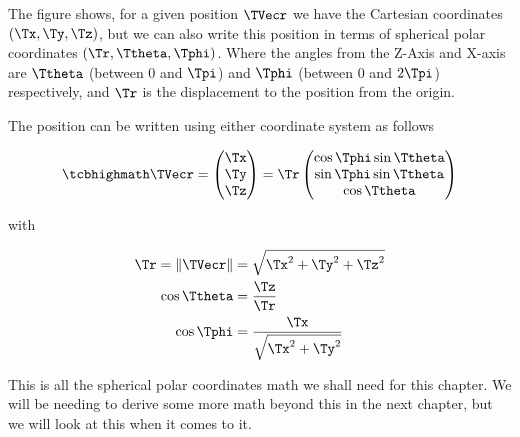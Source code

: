 The figure shows, for a given position $\TVecr $ we have the Cartesian coordinates $({\Tx },{\Ty },{\Tz })$, but we can also write this position in terms of spherical polar coordinates $(\Tr ,\Ttheta ,\Tphi )$.
Where the angles from the Z-Axis and X-axis are $\Ttheta $ (between 0 and $\Tpi $) and $\Tphi $ (between 0 and $2\Tpi $) respectively, and ${\Tr }$ is the displacement to the position from the origin.

The position can be written using either coordinate system as follows

\begin{equation}
	\label{eq: cartesian to spherical polar coordinates}
	\mhl{
		\TVecr  =
		\begin{pmatrix}
			\Tx  \\
			\Ty  \\
			\Tz  \\
		\end{pmatrix}
		= \Tr
		\begin{pmatrix}
			\cos{\Tphi }\sin{\Ttheta } \\
			\sin{\Tphi }\sin{\Ttheta } \\
			\cos{\Ttheta }           \\
		\end{pmatrix}
	}
\end{equation}

with

\begin{equation}
	\begin{aligned}
		\Tr  = \|\TVecr \| & =\sqrt{\Tx ^2 + \Ty ^2 + \Tz ^2}      \\
		\cos\Ttheta             & = \frac{\Tz }{\Tr }                \\
		\cos\Tphi               & = \frac{\Tx }{\sqrt{\Tx ^2 + \Ty ^2} }
	\end{aligned}
\end{equation}

This is all the spherical polar coordinates math we shall need for this chapter.
We will be needing to derive some more math beyond this in the next chapter, but we will look at this when it comes to it.


